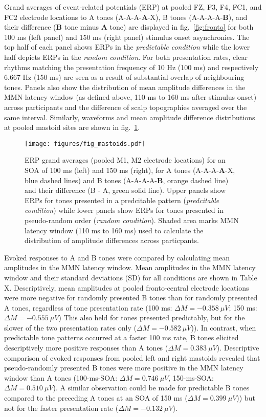 \documentclass[stu,a4paper,12pt, nofontenc, babel, american]{apa7}
\begin{document}
Grand averages of event-related potentials (ERP) at pooled FZ, F3, F4,
FC1, and FC2 electrode locations to A tones (A-A-A-\textbf{A}-X), B
tones (A-A-A-A-\textbf{B}), and their difference (\textbf{B} tone minus
\textbf{A} tone) are displayed in fig.~\ref{fig:fronto} for both 100 ms
(left panel) and 150 ms (right panel) stimulus onset asynchronies. The
top half of each panel shows ERPs in the \emph{predictable condition}
while the lower half depicts ERPs in the \emph{random condition}. For
both presentation rates, clear rhythms matching the presentation
frequency of 10 Hz (100 ms) and respectively 6.667 Hz (150 ms) are seen
as a result of substantial overlap of neighbouring tones. Panels also
show the distribution of mean amplitude differences in the MMN latency
window (as defined above, 110 ms to 160 ms after stimulus onset) across
participants and the difference of scalp topographies averaged over the
same interval. Similarly, waveforms and mean amplitude difference
distributions at pooled mastoid sites are shown in
fig.~\ref{fig:mastoids}.

\begin{figure}
\hypertarget{fig:mastoids}{%
\centering
\texttt{[image: figures/fig\_mastoids.pdf]}
\caption{ERP grand averages (pooled M1, M2 electrode locations) for an
SOA of 100 ms (left) and 150 ms (right), for A tones
(A-A-A-\textbf{A}-X, blue dashed lines) and B tones (A-A-A-A-\textbf{B},
orange dashed line) and their difference (B - A, green solid line).
Upper panels show ERPs for tones presented in a predcitable pattern
(\emph{predcitable condition}) while lower panels show ERPs for tones
presented in pseudo-random order (\emph{random condition}). Shaded area
marks MMN latency window (110 ms to 160 ms) used to calculate the
distribution of amplitude differences across
particpants.}\label{fig:mastoids}
}
\end{figure}

Evoked responses to A and B tones were compared by calculating mean
amplitudes in the MMN latency window. Mean amplitudes in the MMN latency
window and their standard deviations (SD) for all conditions are shown
in Table X. Descriptively, mean amplitudes at pooled fronto-central
electrode locations were more negative for randomly presented B tones
than for randomly presented A tones, regardless of tone presentation
rate (100 ms: \(\Delta M = -0.358 \: \mu V\); 150 ms:
\(\Delta M = -0.555 \: \mu V\)) This also held for tones presented
predictably, but for the slower of the two presentation rates only
(\(\Delta M = -0.582 \: \mu V\))). In contrast, when predictable tone
patterns occurred at a faster 100 ms rate, B tones elicited
descriptively more positive responses than A tones
(\(\Delta M = 0.383 \: \mu V\)). Descriptive comparison of evoked
responses from pooled left and right mastoids revealed that
pseudo-randomly presented B tones were more positive in the MMN latency
window than A tones (100-ms-SOA: \(\Delta M = 0.746 \: \mu V\),
150-ms-SOA: \(\Delta M = 0.510 \: \mu V\)). A similar observation could
be made for predictable B tones compared to the preceding A tones at an
SOA of 150 ms (\(\Delta M = 0.399 \: \mu V\))) but not for the faster
presentation rate (\(\Delta M = -0.132 \: \mu V\)).
\end{document}
